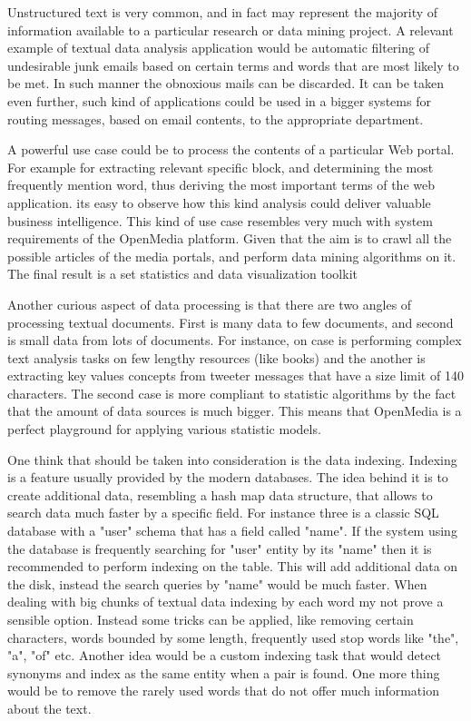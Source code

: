 Unstructured text is very common, and in fact may represent the majority of information available to a particular research or data mining project. A relevant example of textual data analysis application would be automatic filtering of undesirable junk emails based on certain terms and words that are most likely to be met. In such manner the obnoxious mails can be discarded. It can be taken even further, such kind of applications could be used in a bigger systems for routing messages, based on email contents, to the appropriate department.

A powerful use case could be to process the contents of a particular Web portal. For example for extracting relevant specific block, and determining the most frequently mention word, thus deriving the most important terms of the web application. its easy to observe how this kind analysis could deliver valuable business intelligence. This kind of use case resembles very much with system requirements of the OpenMedia platform. Given that the aim is to crawl all the possible articles of the media portals, and perform data mining algorithms on it. The final result is a set statistics and data visualization toolkit

Another curious aspect of data processing is that there are two angles of processing textual documents. First is many data to few documents, and second is small data from lots of documents. For instance, on case is performing complex text analysis tasks on few lengthy resources (like books) and the another is extracting key values concepts from tweeter messages that have a size limit of 140 characters. The second case is more compliant to statistic algorithms by the fact that the amount of data sources is much bigger. This means that OpenMedia is a perfect playground for applying various statistic models.

One think that should be taken into consideration is the data indexing. Indexing is a feature usually provided by the modern databases. The idea behind it is to create additional data, resembling a hash map data structure, that allows to search data much faster by a specific field. For instance three is a classic SQL database with a "user" schema that has a field called "name". If the system using the database is frequently searching for "user" entity by its "name" then it is recommended to perform indexing on the table. This will add additional data on the disk, instead the search queries by "name" would be much faster. When dealing with big chunks of textual data indexing by each word my not prove a sensible option. Instead some tricks can be applied, like removing certain characters, words bounded by some length, frequently used stop words like "the", "a", "of" etc. Another idea would be a custom indexing task that would detect synonyms and index as the same entity when a pair is found. One more thing would be to remove the rarely used words that do not offer much information about the text.

